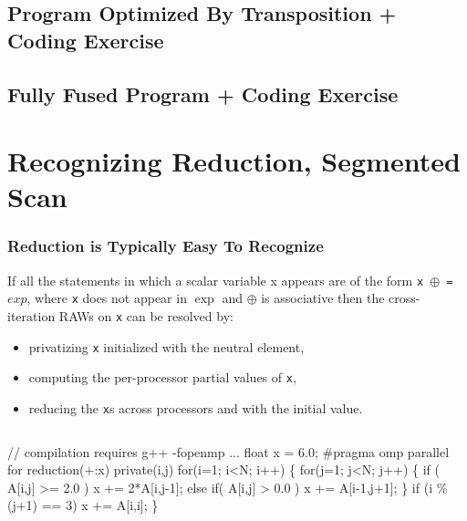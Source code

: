 \documentclass{beamer}
\renewcommand{\emph}[1]{\textcolor{CosGreen}{ #1}}
\begin{document}
\subsection{Program Optimized By Transposition + Coding Exercise}

\subsection{Fully Fused Program + Coding Exercise}


\section{Recognizing Reduction, Segmented Scan}
\begin{frame}[fragile,t]
  \frametitle{Reduction is Typically Easy To Recognize} 

If all the statements in which a scalar variable {x} appears
are of the form {\tt x $\oplus$ = $exp$}, where {\tt x} does 
not appear in $\exp$ and $\oplus$ is associative 
then the cross-iteration RAWs on {\tt x} can be resolved by:
\begin{itemize}
    \item privatizing {\tt x} initialized with the neutral element,
    \item computing the per-processor partial values of {\tt x},
    \item reducing the {\tt x}s across processors and with the initial value.
\end  {itemize} 

\begin{columns}
\begin{colorcode}[fontsize=\scriptsize]
// compilation requires g++ -fopenmp ...
  float x = 6.0;
\#pragma omp parallel for reduction(+:x) private(i,j)
  for(i=1; i<N; i++) \{
    for(j=1; j<N; j++) \{
      if ( A[i,j] >= 2.0 )    \emph{x += 2*A[i,j-1]};
      else if( A[i,j] > 0.0 ) \emph{x += A[i-1,j+1];}
    \}
    if (i \% (j+1) == 3) \emph{x += A[i,i];}
  \}
\end{colorcode}

\end{columns}
\end{frame}
\end{document}
